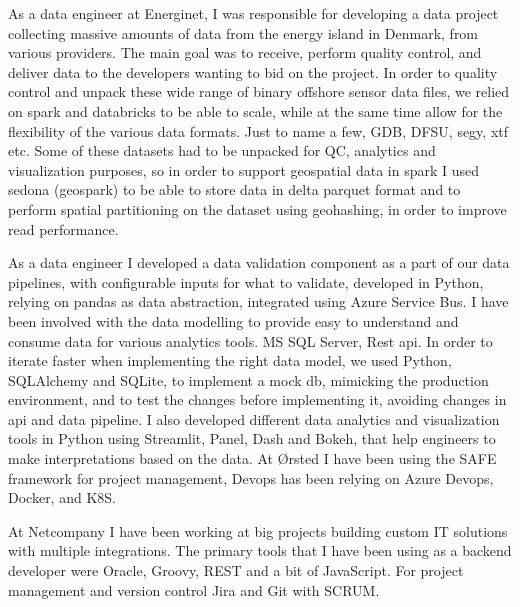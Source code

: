 As a data engineer at Energinet, I was responsible for developing a data project collecting massive amounts of data from the energy island in Denmark, from various providers.
 The main goal was to receive, perform quality control, and deliver data to the developers wanting to bid on the project.
 In order to quality control and unpack these wide range of binary offshore sensor data files, we relied on spark and databricks to be able to scale, while at the same time allow for the flexibility of the various data formats.
 Just to name a few, GDB, DFSU, segy, xtf etc.
 Some of these datasets had to be unpacked for QC, analytics and visualization purposes, so in order to support geospatial data in spark I used sedona (geospark) to be able to store data in delta parquet format and to perform spatial partitioning on the dataset using geohashing, in order to improve read performance.

       
\divider

As a data engineer I developed a data validation component as a part of our data pipelines, with configurable inputs for what to validate, developed in Python, relying on pandas as data abstraction, integrated using Azure Service Bus.
 I have been involved with the data modelling to provide easy to understand and consume data for various analytics tools.
 MS SQL Server, Rest api.
 In order to iterate faster when implementing the right data model, we used Python, SQLAlchemy and SQLite, to implement a mock db, mimicking the production environment, and to test the changes before implementing it, avoiding changes in api and data pipeline.
 I also developed different data analytics and visualization tools in Python using Streamlit, Panel, Dash and Bokeh, that help engineers to make interpretations based on the data.
 At Ørsted I have been using the SAFE framework for project management, Devops has been relying on Azure Devops, Docker, and K8S.

             
\divider

At Netcompany I have been working at big projects building custom IT solutions with multiple integrations.
 The primary tools that I have been using as a backend developer were Oracle, Groovy, REST and a bit of JavaScript.
 For project management and version control Jira and Git with SCRUM.


